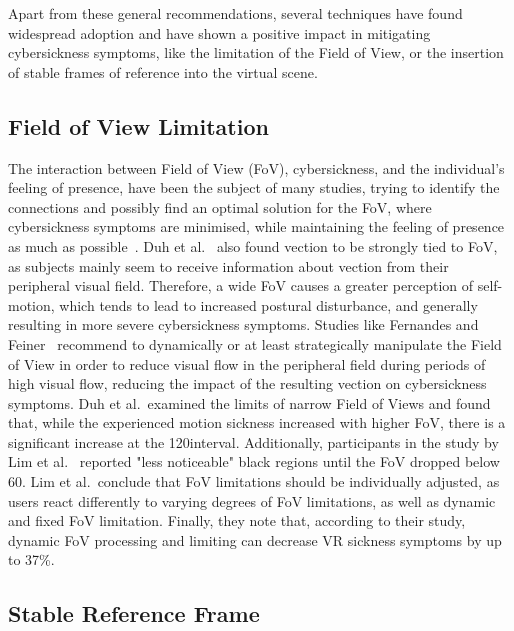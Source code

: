 Apart from these general recommendations, several techniques have found widespread adoption and have shown a positive
impact in mitigating cybersickness symptoms, like the limitation of the Field of View, or the insertion of stable
frames of reference into the virtual scene.


\subsection{Field of View Limitation}\label{subsec:field-of-view-limitation}

The interaction between Field of View (FoV), cybersickness, and the individual's feeling of presence, have been the
subject of many studies, trying to identify the connections and possibly find an optimal solution for the FoV, where
cybersickness symptoms are minimised, while maintaining the feeling of presence as much as possible~\cite{Weech2019}.
Duh et al.~\cite{Duh2001} also found vection to be strongly tied to FoV, as subjects mainly seem to receive
information about vection from their peripheral visual field.
Therefore, a wide FoV causes a greater perception of self-motion, which tends to lead to increased postural
disturbance, and generally resulting in more severe cybersickness symptoms.
Studies like Fernandes and Feiner~\cite{Fernandes2016} recommend to dynamically or at least strategically manipulate
the Field of View in order to reduce visual flow in the peripheral field during periods of high visual flow, reducing
the impact of the resulting vection on cybersickness symptoms.
Duh et al.\ examined the limits of narrow Field of Views and found that, while the experienced motion sickness
increased with higher FoV, there is a significant increase at the 120\textdegree interval.
Additionally, participants in the study by Lim et al.~\cite{Lim2020} reported "less noticeable" black regions until
the FoV dropped below 60\textdegree.
Lim et al.\ conclude that FoV limitations should be individually adjusted, as users react differently to varying
degrees of FoV limitations, as well as dynamic and fixed FoV limitation.
Finally, they note that, according to their study, dynamic FoV processing and limiting can decrease VR sickness
symptoms by up to 37\%.


\subsection{Stable Reference Frame}\label{subsec:stable-reference-frame}

